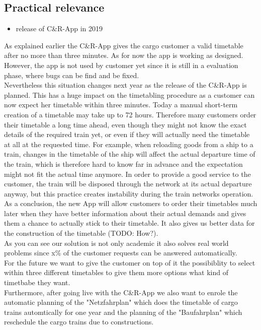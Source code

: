 \subsection{Practical relevance}
\begin{itemize}
  \item release of C\&R-App in 2019 \\
\end{itemize}
As explained earlier the C\&R-App gives the cargo customer a valid timetable after no more than three minutes. As for now the app is working as designed. However, the app is not used by customer yet since it is still in a evaluation phase, where bugs can be find and be fixed. \\
Nevertheless this situation changes next year as the release of the C\&R-App is planned. This has a huge impact on the timetabling procedure as a customer can now expect her timetable within three minutes. Today a manual short-term creation of a timetable may take up to 72 hours. Therefore many customers order their timetable a long time ahead, even though they might not know the exact details of the required train yet, or even if they will actually need the timetable at all at the requested time.
For example, when reloading goods from a ship to a train, changes in the timetable of the ship will affect the actual departure time of the train, which is therefore hard to know far in advance and the expectation might not fit the actual time anymore. In order to provide a good service to the customer, the train will be disposed through the network at its actual departure anyway, but this practice creates instability during the train networks operation.\\
As a conclusion, the new App will allow customers to order their timetables much later when they have better information about their actual demands and gives them a chance to actually stick to their timetable. It also gives us better data for the construction of the timetable (TODO: How?). \\
As you can see our solution is not only academic it also solves real world problems since x\% of the customer requests can be answered automatically. \\
For the future we want to give the customer on top of it the possibiblity to select within three different timetables to give them more options what kind of timetbabe they want. \\
Furthermore, after going live with the C\&R-App we also want to enrole the automatic planning of the "Netzfahrplan" which does the timetable of cargo trains automtically for one year and the planning of the "Baufahrplan" which reschedule the cargo trains due to constructions. \\
